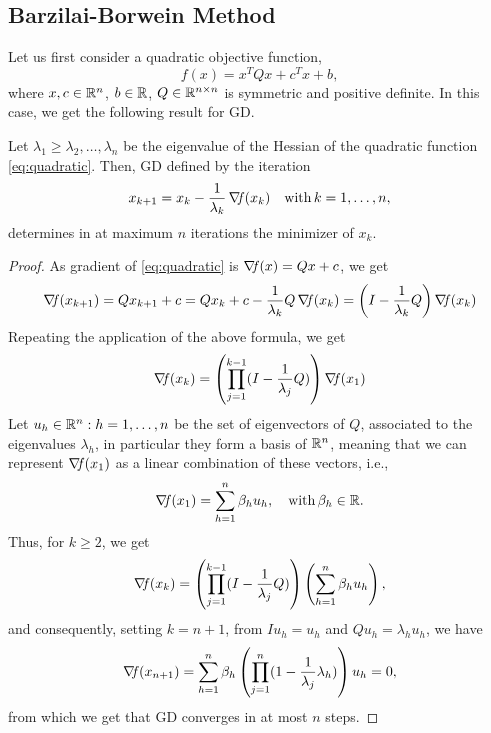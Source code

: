 \documentclass[10pt,a4paper]{article}
\begin{document}
\subsection{Barzilai-Borwein Method}
Let us first consider a quadratic objective function, 
\begin{equation}\label{eq:quadratic}
	f(x) = x^TQx + c^Tx + b,
\end{equation}
where $x,c\in\mathbb{R}^n$, $b\in \mathbb{R}$, $Q\in \mathbb{R}^{n\times n}$ is symmetric and positive definite. In this case, we get the following result for GD.
\begin{proposition}
	Let $\lambda_1\geq \lambda_2, \dots,\lambda_n$ be the eigenvalue of the Hessian of the quadratic function \eqref{eq:quadratic}. Then, GD defined by the iteration
	\begin{equation}\label{eq:eigengrad}
		x_{k+1} = x_k -\frac{1}{\lambda_k} \operatorname*{\mathit{\nabla \!f}}(x_k) \quad \mathord{\mathrm{with }}\, k=1, \dots, n,
	\end{equation}
	determines in at maximum $n$ iterations the minimizer of $x_k$. 
\end{proposition}
\begin{proof}
	As gradient of \eqref{eq:quadratic} is $\operatorname*{\mathit{\nabla \!f}}(x)=Qx+c$, we get
	\begin{equation*}
		\operatorname*{\mathit{\nabla \!f}}(x_{k+1}) = Qx_{k+1} +c = Qx_k +c -\frac{1}{\lambda_k} Q \operatorname*{\mathit{\nabla \!f}}(x_k) = \left(I -\frac{1}{\lambda_k}Q\right)\operatorname*{\mathit{\nabla \!f}}(x_k)
	\end{equation*}
Repeating the application of the above formula, we get 
\begin{equation*}
	\operatorname*{\mathit{\nabla \!f}}(x_k) = \left(\prod_{j=1}^{k-1}(I-\frac{1}{\lambda_j}Q)\right)\operatorname*{\mathit{\nabla \!f}}(x_1)
\end{equation*}
Let ${u_h \in \mathbb{R}^n: h=1, \dots, n}$ be the set of eigenvectors of $Q$, associated to the eigenvalues $\lambda_h$, in particular they form a basis of $\mathbb{R}^n$, meaning that we can represent $\operatorname*{\mathit{\nabla \!f}}(x_1)$ as a linear combination of these vectors, i.e.,  
\begin{equation*}
	\operatorname*{\mathit{\nabla \!f}}(x_1) = \sum_{h=1}^{n} \beta_h u_h,\quad\mathord{\mathrm{with }}\, \beta_h\in\mathbb{R}. 
\end{equation*}
Thus, for $k\geq 2$, we get 
\begin{equation*}
	\operatorname*{\mathit{\nabla \!f}}(x_k) = \left(\prod_{j=1}^{k-1}(I-\frac{1}{\lambda_j}Q)\right) \left(\sum_{h=1}^{n} \beta_h u_h\right),
\end{equation*}
and consequently, setting $k=n+1$, from $Iu_h = u_h$ and $Qu_h=\lambda_hu_h$, we have
\begin{equation*}
	\operatorname*{\mathit{\nabla \!f}}(x_{n+1}) = \sum_{h=1}^{n} \beta_h \left(\prod_{j=1}^{n}(1-\frac{1}{\lambda_j}\lambda_h)\right) u_h=0,
\end{equation*}
from which we get that GD converges in at most $n$ steps.
\end{proof}
\end{document}
